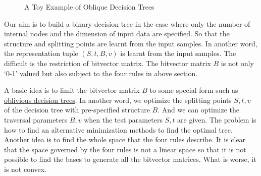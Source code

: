 \documentclass[UTF8]{article}
\begin{document}
\begin{figure}[H] %
\centering %

\caption{A Toy Example of Oblique Decision Trees} %
\label{Fig.main2} %
\end{figure}

Our aim is to build a binary decision tree in the case where only the number of
internal nodes and the dimension of input data are specified.
So that the structure and splitting points are learnt from the input samples.
In another word, the representation tuple $(S, t, B, v)$ is learnt from the input samples.
The difficult is the restriction of bitvector matrix.
The bitvector matrix $B$ is not only `0-1' valued
but also subject to the four rules in above section.

A basic idea is to limit the bitvector matrix $B$ to some special form such as
\href{http://citeseerx.ist.psu.edu/viewdoc/summary?doi=10.1.1.53.8945}{oblivious decision trees}.
In another word, we optimize the splitting points $S, t, v$  of the decision tree with pre-specified structure $B$.
And we can optimize the traversal parameters $B, v$ when the test parameters $S, t$ are given.
The problem is how to find an alternative minimization methods to find the optimal tree.
Another idea is to find the whole space that the four rules describe.
It is clear that the space governed by the four rules is not a linear space
so that it is not possible to find the bases to
generate all the bitvector matrices.
What is worse, it is not convex.

%
%
%
%
\end{document}
